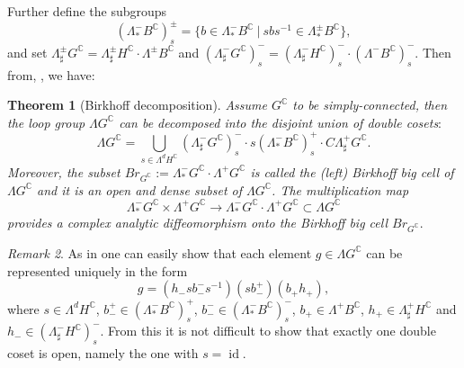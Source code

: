 \documentclass[12pt]{amsart}
\newtheorem{Theorem}{Theorem}[section]
\theoremstyle{definition}
\theoremstyle{remark}
\newtheorem{Remark}[Theorem]{Remark}
\numberwithin{equation}{section}
\begin{document}
 Further  define the subgroups
 \begin{equation*}
 \left(
 \Lambda^{-}_*B^{\mathbb C}
 \right)_{s}^{\pm}=\{b\in \Lambda^{-}_*B^{\mathbb C} \ \vert \ 
 sbs^{-1}\in \Lambda^{\pm}_{*}B^{\mathbb C}\},
\end{equation*}
 and set $\Lambda ^{\pm}_\sharp G^{\mathbb C} =  \Lambda^{\pm }_\sharp H^{\mathbb C} \cdot 
 \Lambda^{\pm} B^{\mathbb C}$ and 
 $(\Lambda ^{-}_{\sharp} G^{\mathbb C})_s^- =  
 (\Lambda^{- }_{\sharp}H^{\mathbb C})_s^-  \cdot 
 (\Lambda^{-} B^{\mathbb C})_s^{-}$.
 Then from\cite[Theorem 4.5]{BD1}, \cite{Kellersch}, 
 we have:
 \begin{Theorem}[Birkhoff decomposition]
 \label{thm:Birkhoff}
 Assume $G^{\mathbb C}$ to be simply-connected, then the loop group ${\Lambda G^{\mathbb C}}$ can be decomposed into  the disjoint union of double cosets$:$
\begin{equation*}
 {\Lambda G^{\mathbb C}} = \bigcup_{s\in \Lambda^{d}H^{\mathbb C}} 
 (\Lambda^{-}_{\sharp}G^{\mathbb C})_s^- \cdot s\left(
 \Lambda^{-}_*B^{\mathbb C}
 \right)_{s}^{+} \cdot  \mathit C \Lambda^{+}_\sharp G^{\mathbb C}.
\end{equation*}
 Moreover, the subset 
 $\mathit {Br}_{G^\mathbb{C}}:=\Lambda^{-}_{*}G^{\mathbb C} \cdot 
 \Lambda^{+} G^{\mathbb C}$
 is called the {\rm (left) Birkhoff big cell}  of $\Lambda G^{\mathbb {C}}$ and it is 
 an open and  dense subset of $\Lambda G^{\mathbb{C}}$. The multiplication map 
\begin{equation*}
\Lambda^{-}_{*}G^{\mathbb C} \times 
 \Lambda^{+} G^{\mathbb C}
 \to 
\Lambda^{-}_{*}G^{\mathbb C} \cdot 
 \Lambda^{+} G^{\mathbb C}
\subset {\Lambda G^{\mathbb C}}
\end{equation*}
 provides a complex analytic diffeomorphism onto the Birkhoff big cell 
 $\mathit {Br}_{G^\mathbb{C}}.$
 \end{Theorem}
\begin{Remark}
 As in \cite{BD1}  one can easily show that each element $g \in \Lambda G^{\mathbb C}$ 
 can be represented uniquely in the form
\begin{equation}
 g = (h_- s b_-^- s^{-1}) (sb_-^+) (b_+ h_+),
\end{equation}
where $s \in  \Lambda^{d}H^{\mathbb C}$, 
 $b_-^+ \in  \left( \Lambda^{-}_*B^{\mathbb C} \right)_{s}^{+}$,
 $b_-^- \in \left( \Lambda^{-}_*B^{\mathbb C} \right)_{s}^{-}$, 
 $b_{+} \in  \Lambda^{+} B^{\mathbb C}$, $h_{+} \in  \Lambda^{+}_{\sharp} H^{\mathbb C}$
 and $h_- \in (\Lambda^-_{\sharp} H ^{\mathbb C})_s^{-}$.
 From this it is not difficult to show that exactly 
 one double coset is open, namely the one with $s = {\operatorname{id}}$.
\end{Remark}
\end{document}
